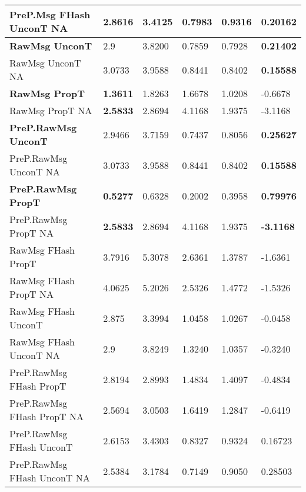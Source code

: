 \begin{table}[htb]
\begin{tabularx}{\textwidth}{|Y|L{0.091\textwidth}|L{0.096\textwidth}|L{0.077\textwidth}|L{0.077\textwidth}|L{0.105\textwidth}|}
        PreP.Msg FHash UnconT NA      		& 2.8616				& 3.4125					& 0.7983					& 0.9316					& 0.20162 		\\
        \hline
        \textbf{RawMsg UnconT }        		& 2.9   				& 3.8200					& 0.7859					& 0.7928					& \textbf{0.21402}		\\
        RawMsg UnconT NA              		& 3.0733				& 3.9588					& 0.8441					& 0.8402					& \textbf{0.15588}		\\
        \hline
        \textbf{RawMsg PropT}       		& \textbf{1.3611}		& 1.8263					& 1.6678					& 1.0208					& -0.6678		\\
        RawMsg PropT NA           			& \textbf{2.5833}		& 2.8694					& 4.1168					& 1.9375					& -3.1168		\\
        \hline
        \textbf{PreP.RawMsg UnconT}    		& 2.9466				& 3.7159					& 0.7437					& 0.8056					& \textbf{0.25627}		\\
        PreP.RawMsg UnconT NA             	& 3.0733				& 3.9588					& 0.8441					& 0.8402					& \textbf{0.15588}		\\
        \hline
        \textbf{PreP.RawMsg PropT }  		& \textbf{0.5277}		& 0.6328					& 0.2002					& 0.3958					& \textbf{0.79976}		\\
        PreP.RawMsg PropT NA        		& \textbf{2.5833}		& 2.8694					& 4.1168					& 1.9375					& \textbf{-3.1168}		\\
        \hline
        RawMsg FHash PropT					& 3.7916				& 5.3078					& 2.6361					& 1.3787					& -1.6361		\\
        RawMsg FHash PropT NA        		& 4.0625				& 5.2026					& 2.5326					& 1.4772					& -1.5326		\\
        \hline
        RawMsg FHash UnconT    				& 2.875 				& 3.3994					& 1.0458					& 1.0267					& -0.0458		\\
        RawMsg FHash UnconT NA         		& 2.9   				& 3.8249					& 1.3240					& 1.0357					& -0.3240		\\
        \hline
        PreP.RawMsg FHash PropT				& 2.8194				& 2.8993					& 1.4834					& 1.4097					& -0.4834		\\
        PreP.RawMsg FHash PropT NA    		& 2.5694				& 3.0503					& 1.6419					& 1.2847					& -0.6419		\\
        \hline
        PreP.RawMsg FHash UnconT			& 2.6153				& 3.4303					& 0.8327					& 0.9324					& 0.16723		\\
        PreP.RawMsg FHash UnconT NA	    	& 2.5384				& 3.1784					& 0.7149					& 0.9050					& 0.28503		\\

\end{tabularx}
\end{table}
